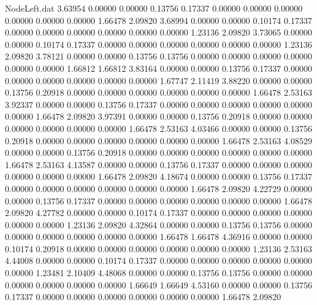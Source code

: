 \begin{filecontents}{NodeLeft.dat}
   3.63954    0.00000    0.00000     0.13756    0.17337    0.00000    0.00000    0.00000    0.00000    0.00000    0.00000    1.66478    2.09820
   3.68994    0.00000    0.00000     0.10174    0.17337    0.00000    0.00000    0.00000    0.00000    0.00000    0.00000    1.23136    2.09820
   3.73065    0.00000    0.00000     0.10174    0.17337    0.00000    0.00000    0.00000    0.00000    0.00000    0.00000    1.23136    2.09820
   3.78121    0.00000    0.00000     0.13756    0.13756    0.00000    0.00000    0.00000    0.00000    0.00000    0.00000    1.66812    1.66812
   3.83164    0.00000    0.00000     0.13756    0.17337    0.00000    0.00000    0.00000    0.00000    0.00000    0.00000    1.67747    2.11419
   3.88220    0.00000    0.00000     0.13756    0.20918    0.00000    0.00000    0.00000    0.00000    0.00000    0.00000    1.66478    2.53163
   3.92337    0.00000    0.00000     0.13756    0.17337    0.00000    0.00000    0.00000    0.00000    0.00000    0.00000    1.66478    2.09820
   3.97391    0.00000    0.00000     0.13756    0.20918    0.00000    0.00000    0.00000    0.00000    0.00000    0.00000    1.66478    2.53163
   4.03466    0.00000    0.00000     0.13756    0.20918    0.00000    0.00000    0.00000    0.00000    0.00000    0.00000    1.66478    2.53163
   4.08529    0.00000    0.00000     0.13756    0.20918    0.00000    0.00000    0.00000    0.00000    0.00000    0.00000    1.66478    2.53163
   4.13587    0.00000    0.00000     0.13756    0.17337    0.00000    0.00000    0.00000    0.00000    0.00000    0.00000    1.66478    2.09820
   4.18674    0.00000    0.00000     0.13756    0.17337    0.00000    0.00000    0.00000    0.00000    0.00000    0.00000    1.66478    2.09820
   4.22729    0.00000    0.00000     0.13756    0.17337    0.00000    0.00000    0.00000    0.00000    0.00000    0.00000    1.66478    2.09820
   4.27782    0.00000    0.00000     0.10174    0.17337    0.00000    0.00000    0.00000    0.00000    0.00000    0.00000    1.23136    2.09820
   4.32864    0.00000    0.00000     0.13756    0.13756    0.00000    0.00000    0.00000    0.00000    0.00000    0.00000    1.66478    1.66478
   4.36916    0.00000    0.00000     0.10174    0.20918    0.00000    0.00000    0.00000    0.00000    0.00000    0.00000    1.23136    2.53163
   4.44008    0.00000    0.00000     0.10174    0.17337    0.00000    0.00000    0.00000    0.00000    0.00000    0.00000    1.23481    2.10409
   4.48068    0.00000    0.00000     0.13756    0.13756    0.00000    0.00000    0.00000    0.00000    0.00000    0.00000    1.66649    1.66649
   4.53160    0.00000    0.00000     0.13756    0.17337    0.00000    0.00000    0.00000    0.00000    0.00000    0.00000    1.66478    2.09820

\end{filecontents}
